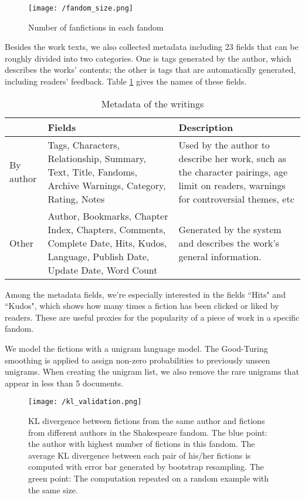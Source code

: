 \documentclass[11pt]{article} %
\begin{document}
\begin{figure}[htbp]
\begin{center}
\texttt{[image: /fandom\_size.png]}
\caption{Number of fanfictions in each fandom}
\label{fig:fandom_size}
\end{center}
\end{figure}


Besides the work texts, we also collected metadata including 23 fields that can be roughly divided into two categories. One is tags generated by the author, which describes the works' contents; the other is tags that are automatically generated, including readers' feedback. Table \ref{tab:metadata} gives the names of these fields. 

\begin{table}[htp]
\caption{Metadata of the writings}
\begin{center}
\begin{tabular}{p{2cm}|p{3cm}|p{5cm}}
  \hline			
 & Fields & Description\\ 
   \hline			
By author & Tags, Characters, Relationship, Summary, Text, Title, 
Fandoms,  Archive Warnings, Category, Rating, Notes &
Used by the author to describe her work, such as the character pairings, age limit on 
readers, warnings for controversial themes, etc
\\
\hline
 Other & Author, Bookmarks, Chapter Index, Chapters, Comments, Complete Date, 
 Hits, Kudos, Language, Publish Date, Update Date, Word Count
 & Generated by the system and describes the work's general information. \\
\hline
\end{tabular}
\end{center}
\label{tab:metadata}
\end{table}%

Among the metadata fields, we're especially interested in the fields ``Hits" and ``Kudos", which shows how many times a fiction has been clicked or liked by readers. These are useful proxies for the popularity of a piece of work in a specific fandom.

We model the fictions with a unigram language model. The Good-Turing smoothing\cite{gales1995good} is applied to assign non-zero probabilities to previously unseen unigrams. When creating the unigram list, we also remove the rare unigrams that appear in less than 5 documents.

\begin{figure}[htbp]
\begin{center}
\texttt{[image: /kl\_validation.png]}
\caption{KL divergence between fictions from the same author and fictions from different authors in the Shakespeare fandom. The blue point: the author with highest number of fictions in this fandom. The average KL divergence between each pair of his/her fictions is computed with error bar generated by bootstrap resampling. The green point: The computation repeated on a random example with the same size.}
\label{fig:kl_validation}
\end{center}
\end{figure}
\end{document}
